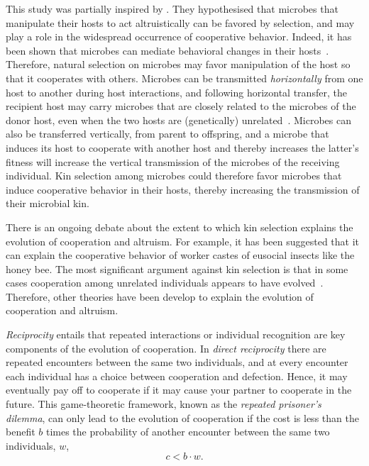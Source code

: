 \documentclass[12pt]{extarticle}
\begin{document}
{This study was partially inspired by \citet{lewin2017microbes}. 
They hypothesised that microbes that manipulate their hosts to act altruistically can be favored by selection, and may play a role in the widespread occurrence of cooperative behavior. Indeed, it has been shown that microbes can mediate behavioral changes in their hosts~\citep{dobson1988population,poulin2010parasite}. Therefore, natural selection on microbes may favor manipulation of the host so that it cooperates with others. Microbes can be transmitted \emph{horizontally} from one host to another during host interactions, and following horizontal transfer, the recipient host may carry microbes that are closely related to the microbes of the donor host, even when the two hosts are (genetically) unrelated~\citep{lewin2017microbes}. Microbes can also be transferred vertically, from parent to offspring, and %
a microbe that induces its host to cooperate with another host and thereby increases the latter's fitness will  increase the vertical transmission of the microbes of the receiving individual. Kin selection among microbes could therefore favor microbes that induce cooperative behavior in their hosts, thereby increasing the transmission of their microbial kin.




There is an ongoing debate about the extent to which kin selection explains the evolution of cooperation and altruism.
For example, it has been suggested that it can explain the cooperative behavior of worker castes of eusocial insects like the honey bee. %
The most significant argument against kin selection is that in some cases cooperation among unrelated individuals appears to have evolved~\citep{wilson2005kin}.
Therefore, other theories have been develop to explain the evolution of cooperation and altruism.

\emph{Reciprocity} entails that repeated interactions or individual recognition are key components of the evolution of cooperation. In \emph{direct reciprocity} there are repeated encounters between the same two individuals, and at every encounter each individual has a choice between cooperation and defection. Hence, it may eventually pay off to cooperate if it may cause your partner to cooperate in the future.
This game-theoretic framework, known as the \emph{repeated prisoner's dilemma}, 
can only lead to the evolution of cooperation if the cost is less than the benefit $b$ times the probability of another encounter between the same two individuals, $w$, 
\begin{equation} \label{eq:reciprocity}
c < b \cdot w.
\end{equation}

}
\end{document}

